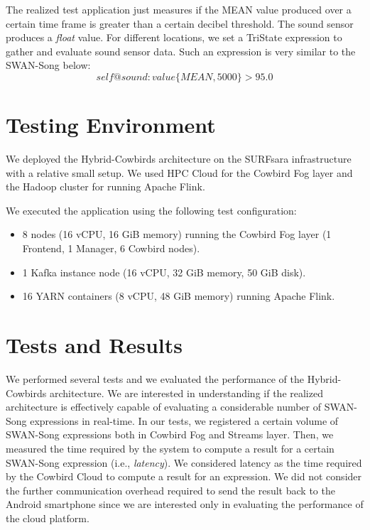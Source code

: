 The realized test application just measures if the MEAN value produced over a certain time frame is greater than a certain decibel threshold. The sound sensor produces a \emph{float} value. For different locations, we set a TriState expression to gather and evaluate sound sensor data. Such an expression is very similar to the SWAN-Song below:
\begin{equation}\label{eq:sound_sensor_tristate}
self@sound:value\big\{MEAN, 5000\big\} > 95.0
\end{equation}

\section{Testing Environment}
We deployed the Hybrid-Cowbirds architecture on the SURFsara infrastructure \cite{surfsaraonline} with a relative small setup. We used HPC Cloud \cite{surfsarahpccloudonline} for the Cowbird Fog layer and the Hadoop cluster \cite{surfsarahadooponline} for running Apache Flink. 

We executed the application using the following test configuration:
\begin{itemize}
\item 8 nodes (16 vCPU, 16 GiB memory) running the Cowbird Fog layer (1 Frontend, 1 Manager, 6 Cowbird nodes).
\item 1 Kafka instance node (16 vCPU, 32 GiB memory, 50 GiB disk).
\item 16 YARN containers (8 vCPU, 48 GiB memory) running Apache Flink.
\end{itemize}

\section{Tests and Results} 
We performed several tests and we evaluated the performance of the Hybrid-Cowbirds architecture. We are interested in understanding if the realized architecture is effectively capable of evaluating a considerable number of SWAN-Song expressions in real-time.
In our tests, we registered a certain volume of SWAN-Song expressions  both in Cowbird Fog and Streams layer. Then, we measured the time required by the system to compute a result for a certain SWAN-Song expression (i.e., \emph{latency}). We considered latency as the time required by the Cowbird Cloud to compute a result for an expression. We did not consider the further communication overhead required to send the result back to the Android smartphone since we are interested only in evaluating the performance of the cloud platform.

